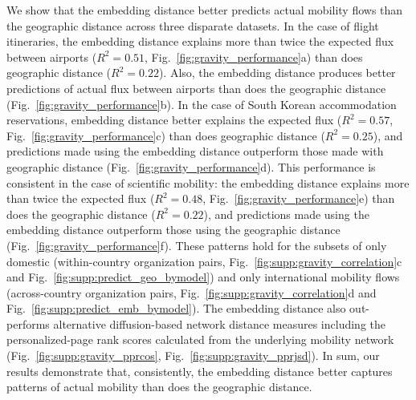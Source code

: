 \documentclass[12pt]{article} %
\begin{document}
We show that the embedding distance better predicts actual mobility flows than the geographic distance across three disparate datasets.
In the case of flight itineraries, the embedding distance explains more than twice the expected flux between airports ($R^{2} = 0.51$, Fig.~\ref{fig:gravity_performance}a) than does geographic distance ($R^{2} = 0.22$).  Also, the embedding distance produces better predictions of actual flux between airports than does the geographic distance (Fig.~\ref{fig:gravity_performance}b).
In the case of South Korean accommodation reservations, embedding distance better explains the expected flux ($R^{2} = 0.57$, Fig.~\ref{fig:gravity_performance}c) than does geographic distance ($R^{2} = 0.25$), and predictions made using the embedding distance outperform those made with geographic distance (Fig.~\ref{fig:gravity_performance}d). 
This performance is consistent in the case of scientific mobility:
the embedding distance explains more than twice the expected flux ($R^{2} = 0.48$, Fig.~\ref{fig:gravity_performance}e) than does the geographic distance ($R^{2} = 0.22$), and predictions made using the embedding distance outperform those using the geographic distance (Fig.~\ref{fig:gravity_performance}f).
These patterns hold for the subsets of only domestic (within-country organization pairs, Fig.~\ref{fig:supp:gravity_correlation}c and Fig.~\ref{fig:supp:predict_geo_bymodel}) and only international mobility flows (across-country organization pairs, Fig.~\ref{fig:supp:gravity_correlation}d and  Fig.~\ref{fig:supp:predict_emb_bymodel}).
The embedding distance also out-performs alternative diffusion-based network distance measures including the personalized-page rank scores  calculated from the underlying mobility network (Fig.~\ref{fig:supp:gravity_pprcos}, Fig.~\ref{fig:supp:gravity_pprjsd}).
In sum, our results demonstrate that, consistently, the embedding distance better captures patterns of actual mobility than does the geographic distance.
\end{document}
